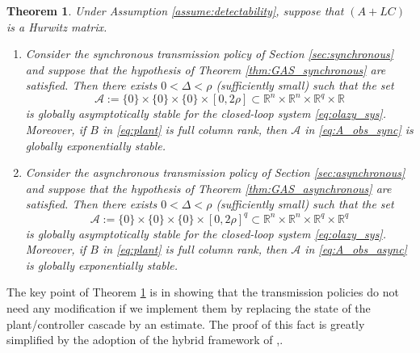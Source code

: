 \documentclass[twocolumn]{autart}
\newtheorem{theorem}{Theorem}
\newcommand{\realn}{\real^n}
\newcommand\real{\ensuremath{{\mathbb R}}}
\begin{document}
\begin{theorem}
\label{thm:GASoutput} 
 Under Assumption \ref{assume:detectability}, suppose that $(A+LC)$ is a Hurwitz matrix.
 \begin{enumerate}
  \item Consider the synchronous transmission policy of Section \ref{sec:synchronous}
  and suppose that the hypothesis of  Theorem \ref{thm:GAS_synchronous} are satisfied.
  Then there exists $0<\Delta<\rho$ (sufficiently small) such that the set
  \begin{equation}
  \label{eq:A_obs_sync} 
  \mathcal{A} := \{0\}\!\times\! \{0\} \!\times\! \{0\} \!\times\! [0,2\rho]
  \subset \realn\!\times\!\realn\!\times\!\real^q\!\times\!\real
  \end{equation}
  is globally asymptotically stable for the closed-loop system \eqref{eq:olazy_sys}.
  Moreover, if $B$ in \eqref{eq:plant} is full column rank, then $\mathcal{A}$ in \eqref{eq:A_obs_sync} is globally exponentially stable.
  \item Consider the asynchronous transmission policy of Section \ref{sec:asynchronous}
  and suppose that the hypothesis of  Theorem \ref{thm:GAS_asynchronous} are satisfied. 
  Then there exists $0<\Delta<\rho$ (sufficiently small) such that the set
  \begin{equation}
  \label{eq:A_obs_async} 
  \mathcal{A} := \{0\}\!\times\! \{0\} \!\times\! \{0\} \!\times\! [0,2\rho]^q
  \subset \realn\!\times\!\realn\!\times\!\real^q\!\times\!\real^q
  \end{equation}
  is globally asymptotically stable for the closed-loop system \eqref{eq:olazy_sys}.
  Moreover, if $B$ in \eqref{eq:plant} is full column rank, then $\mathcal{A}$ in \eqref{eq:A_obs_async} is globally exponentially stable.
 \end{enumerate}
\end{theorem}

{
The key point of Theorem \ref{thm:GASoutput} is in showing that the transmission policies do
not need any modification if we implement them by replacing the state of the
plant/controller cascade by an estimate. The proof of this fact is greatly simplified by
the adoption of the hybrid framework of \cite{GoebelCSM09},\cite{Goebel06}.}
\end{document}
